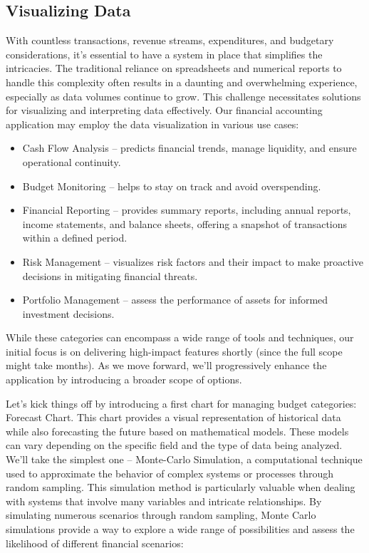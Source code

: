 
\subsection{Visualizing Data}

With countless transactions, revenue streams, expenditures, and budgetary considerations, it's essential to have a 
system in place that simplifies the intricacies. The traditional reliance on spreadsheets and numerical reports to 
handle this complexity often results in a daunting and overwhelming experience, especially as data volumes continue 
to grow.  This challenge necessitates solutions for visualizing and interpreting data effectively. Our financial 
accounting application may employ the data visualization in various use cases:

\begin{itemize}
  \item Cash Flow Analysis -- predicts financial trends, manage liquidity, and ensure operational continuity.

  \item Budget Monitoring -- helps to stay on track and avoid overspending.

  \item Financial Reporting -- provides summary reports, including annual reports, income statements, and balance 
  sheets, offering a snapshot of transactions within a defined period.

  \item Risk Management -- visualizes risk factors and their impact to make proactive decisions in mitigating financial 
  threats.

  \item Portfolio Management -- assess the performance of assets for informed investment decisions.
\end{itemize}

\noindent While these categories can encompass a wide range of tools and techniques, our initial focus is on delivering 
high-impact features shortly (since the full scope might take months). As we move forward, we'll progressively enhance 
the application by introducing a broader scope of options.

Let's kick things off by introducing a first chart for managing budget categories: Forecast Chart. 
This chart provides a visual representation of historical data while also forecasting the future based on mathematical 
models. These models can vary depending on the specific field and the type of data being analyzed. We'll take the 
simplest one -- Monte-Carlo Simulation, a computational technique used to approximate the behavior of complex systems 
or processes through random sampling. This simulation method is particularly valuable when dealing with systems that 
involve many variables and intricate relationships. By simulating numerous scenarios through random sampling, Monte 
Carlo simulations provide a way to explore a wide range of possibilities and assess the likelihood of different 
financial scenarios:

